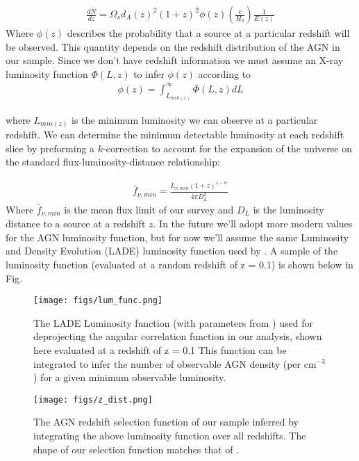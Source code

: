 \documentclass[preprint]{aastex63}
\begin{document}
    \begin{align}
        \label{eq:dndz}
        \frac{dN}{dz} = \Omega_s d_A(z)^2 (1+z)^2 \phi(z) \left(\frac{c}{H_0}\right)\frac{1}{E(z)}
    \end{align}
    Where $\phi(z)$ describes the probability that a source at a particular redshift will be observed. This quantity depends 
    on the redshift distribution of the AGN in our sample. Since we don't have redshift information we must assume an X-ray luminosity function 
     $\Phi(L,z)$ to infer $\phi(z)$ according to
     \begin{align}
         \label{eq:phi}
         \phi(z) = \int_{L_{min(z)}}^{\infty} \Phi(L,z) dL 
     \end{align}
    
     where $L_{min(z)}$ is the minimum luminosity we can observe at a particular redshift. We can determine the minimum detectable luminosity at each redshift slice
    by preforming a $k$-correction to account for the expansion of the universe on the standard flux-luminosity-distance relationship:

    \begin{align}
        \label{eq:flux_lim}
        \bar f_{\nu,min} = \frac{L_{\nu,min}(1+z)^{1-\alpha}}{4\pi D_L^2}
    \end{align}
    Where $ \bar f_{\nu,min}$ is the mean flux limit of our survey and $D_L$ is the luminosity distance to 
    a source at a redshift $z$.
     In the future we'll adopt more modern values for the AGN luminosity function, but for now we'll assume the same Luminosity and Density Evolution  (LADE) luminosity function used by \citet{koutoulidis} \citep{aird:2010}. 
    A sample of the luminosity function (evaluated at a random redshift of z = 0.1) is shown below in Fig. 
    
    \begin{figure}[!ht]
        \centering
        \texttt{[image: figs/lum\_func.png]}
        \label{fig:lum_func}
        \caption{The LADE Luminosity function (with parameters from \citet{aird:2010}) used for deprojecting the angular correlation function in our analysis, shown here evaluated at a redshift of z = 0.1
        This function can be integrated to infer the number of observable AGN density (per $\text{cm}^{-3}$) for a given minimum observable luminosity.}
    \end{figure}
    
    \begin{figure}[!ht]
        \centering
        \texttt{[image: figs/z\_dist.png]}
        \label{fig:z_dist}
        \caption{The AGN redshift selection function of our sample  inferred by integrating the above luminosity function over all redshifts. 
        The shape of our selection function matches that of \citet{ebrero}. }
    \end{figure}
    
\end{document}
